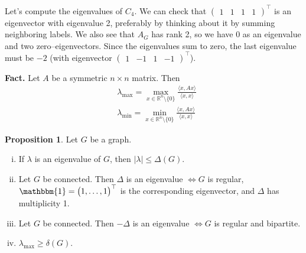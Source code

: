 \documentclass{article}
\theoremstyle{definition}
\newtheorem{prop}[theorem]{Proposition}
\begin{document}
Let's compute the eigenvalues of $C_4$. We can check that $\begin{pmatrix} 1&1&1&1 \end{pmatrix}^\top$ is an eigenvector with eigenvalue 2, preferably by thinking about it by summing neighboring labels. We also see that $A_G$ has rank 2, so we have 0 as an eigenvalue and two zero--eigenvectors. Since the eigenvalues sum to zero, the last eigenvalue must be $-2$ (with eigenvector $\begin{pmatrix} 1 & -1 & 1 & -1 \end{pmatrix}^\top$).
\vspace{1mm}

\textbf{Fact.} Let $A$ be a symmetric $n \times n$ matrix. Then 
\begin{align*}
    &\lambda_{\max} = \max_{x \in \mathbb{R}^n\setminus \{0\}} \frac{\langle x, Ax \rangle}{\langle x, x \rangle}\\
    &\lambda_{\min} = \min_{x \in \mathbb{R}^n\setminus \{0\}} \frac{\langle x, Ax \rangle}{\langle x, x \rangle}
\end{align*}
\begin{prop}\label{7.1}
    Let $G$ be a graph.
    \begin{enumerate}[(i)]
        \item If $\lambda$ is an eigenvalue of $G$, then $|\lambda|\le \Delta(G)$.
        \item Let $G$ be connected. Then $\Delta$ is an eigenvalue $\iff G$ is regular, $\mathbbm{1}=\begin{pmatrix} 1,\ldots,1 \end{pmatrix}^\top$ is the corresponding eigenvector, and $\Delta$ has multiplicity 1.
        \item Let $G$ be connected. Then $-\Delta$ is an eigenvalue $\iff G$ is regular and bipartite.
        \item $\lambda_{\max} \ge \delta(G)$.
    \end{enumerate}
\end{prop}
\end{document}
